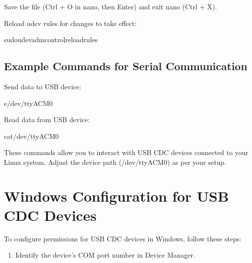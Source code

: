 \documentclass[letterpaper,10pt,english]{sphinxmanual}
\begin{document}
\sphinxAtStartPar
Save the file (Ctrl + O in nano, then Enter) and exit nano (Ctrl + X).

\sphinxAtStartPar
Reload udev rules for changes to take effect:

\begin{sphinxVerbatim}[commandchars=\\\{\}]
sudoudevadmcontrol\PYGZhy{}\PYGZhy{}reload\PYGZhy{}rules
\end{sphinxVerbatim}


\subsection{Example Commands for Serial Communication}
\label{\detokenize{cdc:example-commands-for-serial-communication}}
\sphinxAtStartPar
Send data to USB device:

\begin{sphinxVerbatim}[commandchars=\\\{\}]
\PYGZhy{}e\PYGZgt{}/dev/ttyACM0
\end{sphinxVerbatim}

\sphinxAtStartPar
Read data from USB device:

\begin{sphinxVerbatim}[commandchars=\\\{\}]
cat/dev/ttyACM0
\end{sphinxVerbatim}

\sphinxAtStartPar
These commands allow you to interact with USB CDC devices connected to your Linux system. Adjust the device path (/dev/ttyACM0) as per your setup.


\section{Windows Configuration for USB CDC Devices}
\label{\detokenize{cdc:windows-configuration-for-usb-cdc-devices}}
\sphinxAtStartPar
To configure permissions for USB CDC devices in Windows, follow these steps:
\begin{enumerate}
%
\item {} 
\sphinxAtStartPar
Identify the device’s COM port number in Device Manager.

\end{enumerate}
\end{document}
